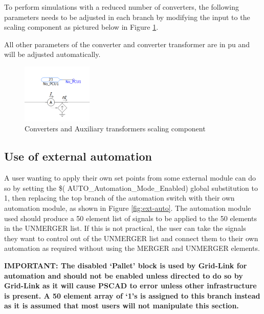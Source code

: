 \documentclass{../grid-link-report}
\begin{document}
	

	To perform simulations with a reduced number of converters, the following parameters needs to be adjusted in each branch by modifying the input to the scaling component as pictured below in Figure \ref{fig:inv-scaling-component}.

	All other parameters of the converter and converter transformer are in pu and will be adjusted automatically.
	
	
	\begin{figure}[H]
		\centering
		\includegraphics[width=0.3\textwidth]{report-assets/images/inv-scaling-component.png}
		\caption{Converters and Auxiliary transformers scaling component}
		\label{fig:inv-scaling-component}
	\end{figure}
	

	
	
	\subsection{Use of external automation}
	
	A user wanting to apply their own set points from some external module can do so by setting the \$( AUTO_Automation_Mode_Enabled) global substitution to 1, then replacing the top branch of the automation switch with their own automation module, as shown in Figure \ref{fig:ext-auto}. The automation module used should produce a 50 element list of signals to be applied to the 50 elements in the UNMERGER list. If this is not practical, the user can take the signals they want to control out of the UNMERGER list and connect them to their own automation as required without using the MERGER and UNMERGER elements.
	
	\bfseries{IMPORTANT: The disabled ‘Pallet’ block is used by Grid-Link for automation and should not be enabled unless directed to do so by Grid-Link as it will cause PSCAD to error unless other infrastructure is present. A 50 element array of ‘1’s is assigned to this branch instead as it is assumed that most users will not manipulate this section.}
\end{document}
